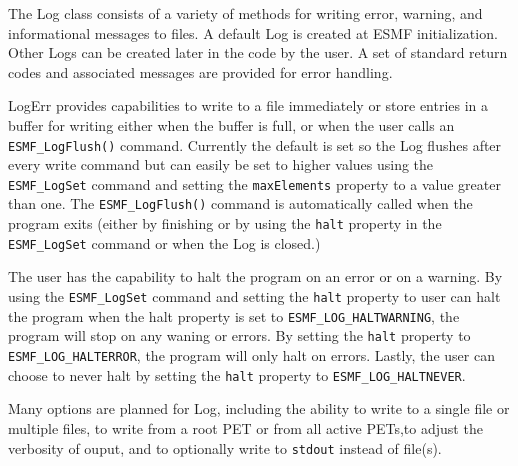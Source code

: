 



The Log class consists of a variety of methods for writing error, warning, and
informational messages to files.  A default Log is created at ESMF
initialization.  Other Logs can be created later in the code by the user.  A set
of standard return codes and associated messages are provided for error 
handling.  

LogErr provides capabilities to write to a file immediately or store entries in a 
buffer for writing either when the buffer is full, or when the user calls an 
{\tt ESMF\_LogFlush()} command.  Currently the default is set so the Log flushes
after every write command but can easily be set to higher values using the 
{\tt ESMF\_LogSet} command and setting the {\tt maxElements} property to a value
greater than one.  The {\tt ESMF\_LogFlush()} command is automatically
called when the program exits (either by finishing or by using the {\tt halt}
property in the {\tt ESMF\_LogSet} command or when the Log is closed.)

The user has the capability to halt the program on an error or on a warning.  By 
using the {\tt ESMF\_LogSet} command and setting the {\tt halt} property to
user can halt the program when the halt property is set to 
{\tt ESMF\_LOG\_HALTWARNING}, the program will stop on any waning or errors.  By
setting the {\tt halt} property to {\tt ESMF\_LOG\_HALTERROR}, the program will 
only halt on errors.  Lastly, the user can choose to never halt by setting the 
{\tt halt} property to {\tt ESMF\_LOG\_HALTNEVER}.

Many options are planned for Log, including the ability to write to a single
file or multiple files, to write from a root PET or from all active PETs,to 
adjust the verbosity of ouput, and to optionally write to {\tt stdout} instead 
of file(s).




